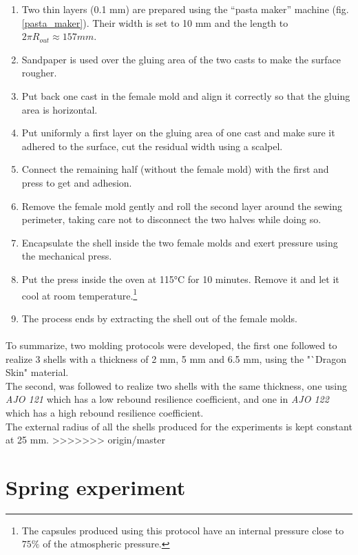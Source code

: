 \begin{enumerate}
	\item Two thin layers (0.1 mm) are prepared using the "`pasta maker"' machine (fig.\ref{pasta_maker}). Their width is set to 10 mm and the length to $2\pi R_{out} \approx 157 mm$.
	\item Sandpaper is used over the gluing area of the two casts to make the surface rougher.
	\item Put back one cast in the female mold and align it correctly so that the gluing area is horizontal.
	\item Put uniformly a first layer on the gluing area of one cast and make sure it adhered to the surface, cut the residual width using a scalpel.
	\item Connect the remaining half (without the female mold) with the first and press to get and adhesion.
	\item Remove the female mold gently and roll the second layer around the sewing perimeter, taking care not to disconnect the two halves while doing so.
	\item Encapsulate the shell inside the two female molds and exert pressure using the mechanical press.
	\item Put the press inside the oven at 115°C for 10 minutes. Remove it and let it cool at room temperature.\footnote{The capsules produced using this protocol have an internal pressure close to $75\%$ of the atmospheric pressure.}
	\item The process ends by extracting the shell out of the female molds.
\end{enumerate}
\paragraph{}
To summarize, two molding protocols were developed, the first one followed to realize  3 shells with a thickness of 2 mm, 5 mm and 6.5 mm, using the "`Dragon Skin" material.\\
The second, was followed to realize two shells with the same thickness, one using \emph{AJO 121} which has a low rebound resilience coefficient, and one in \emph{AJO 122} which has a high rebound resilience coefficient. \\
The external radius of all the shells produced for the experiments is kept constant at 25 mm.
>>>>>>> origin/master
\newpage
\section{Spring experiment}
